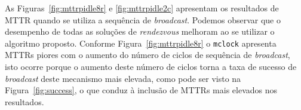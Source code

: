 {%


As Figuras~\ref{fig:mttrpidle8r} e \ref{fig:mttrpidle2c} apresentam os resultados de MTTR quando se utiliza a sequência de {\it broadcast}. Podemos observar que o desempenho de todas as soluções de {\it rendezvous} melhoram ao se utilizar o algoritmo proposto. Conforme Figura~\ref{fig:mttrpidle8r} o {\tt mclock} apresenta MTTRs piores com o aumento do número de ciclos de sequência de {\it broadcast}, isto ocorre porque o aumento deste número de ciclos torna a taxa de sucesso de {\it broadcast} deste mecanismo mais elevada, como pode ser visto na Figura~\ref{fig:success}, o que conduz à inclusão de MTTRs mais elevados nos resultados.%







}
